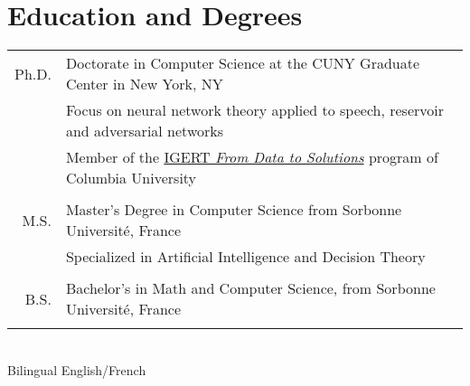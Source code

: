 \documentclass[a4paper,10pt]{article}
\begin{document}
\section{Education and Degrees}
    \vspace{0.2cm}
    \begin{tabular}{r|p{160mm}} 
        Ph.D. & Doctorate in Computer Science at the CUNY Graduate Center in New York, NY\\
        & \small{Focus on neural network theory applied to speech, reservoir and adversarial networks}\\
        \hphantom{\textbf{Hunter}} & \small{Member of the \href{http://www.cs.columbia.edu/igert/people_students.shtml}{IGERT {\em From Data to Solutions}} program of Columbia University}\\
        \multicolumn{2}{c}{} \vspace{-1.5mm} \\

        M.S. & Master's Degree in Computer Science from Sorbonne Université, France \\
        & \small{Specialized in Artificial Intelligence and Decision Theory}\\
        \multicolumn{2}{c}{} \vspace{-1.5mm} \\
         
        B.S. & Bachelor's in Math and Computer Science, from Sorbonne Université, France \\ 
        \multicolumn{2}{c}{} \vspace{-1.5mm} \\
        
         
         

    \end{tabular}\\
\hphantom{........}\small{Bilingual English/French}\\
\end{document}
